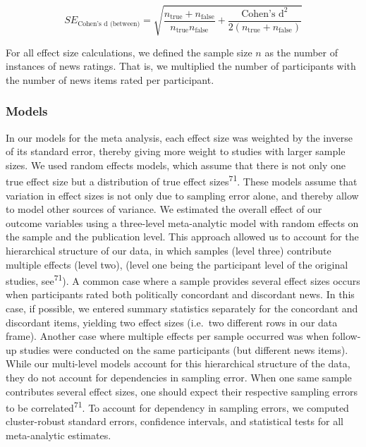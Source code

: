 \documentclass[
  doc,floatsintext]{apa6}
\begin{document}
\[
SE_{\text{Cohen's d (between)}} = \sqrt{\frac{n_{\text{true}}+n_{\text{false}}}{n_{\text{true}}n_{\text{false}}}+\frac{\text{Cohen's d}^2}{2(n_{\text{true}}+n_{\text{false}})}}
\]

For all effect size calculations, we defined the sample size \(n\) as the number of instances of news ratings. That is, we multiplied the number of participants with the number of news items rated per participant.

\subsubsection{Models}\label{models}

In our models for the meta analysis, each effect size was weighted by the inverse of its standard error, thereby giving more weight to studies with larger sample sizes. We used random effects models, which assume that there is not only one true effect size but a distribution of true effect sizes\textsuperscript{71}. These models assume that variation in effect sizes is not only due to sampling error alone, and thereby allow to model other sources of variance. We estimated the overall effect of our outcome variables using a three-level meta-analytic model with random effects on the sample and the publication level. This approach allowed us to account for the hierarchical structure of our data, in which samples (level three) contribute multiple effects (level two), (level one being the participant level of the original studies, see\textsuperscript{71}). A common case where a sample provides several effect sizes occurs when participants rated both politically concordant and discordant news. In this case, if possible, we entered summary statistics separately for the concordant and discordant items, yielding two effect sizes (i.e.~two different rows in our data frame). Another case where multiple effects per sample occurred was when follow-up studies were conducted on the same participants (but different news items). While our multi-level models account for this hierarchical structure of the data, they do not account for dependencies in sampling error. When one same sample contributes several effect sizes, one should expect their respective sampling errors to be correlated\textsuperscript{71}. To account for dependency in sampling errors, we computed cluster-robust standard errors, confidence intervals, and statistical tests for all meta-analytic estimates.
\end{document}
